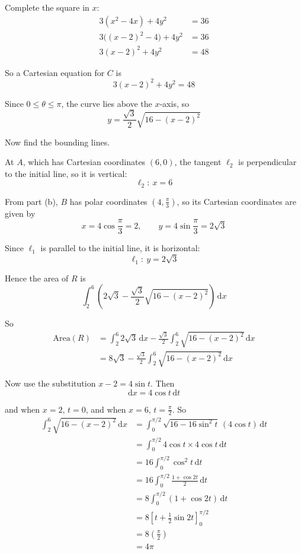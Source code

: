 \documentclass[leqno]{article}
\begin{document}
\begin{enumerate}[
  label=\textbf{\arabic*.},
  leftmargin=*,
  topsep=0pt,
  partopsep=0pt,
  parsep=0pt
]
\begin{djsSolution}
\begin{enumerate}[label=\textbf{(\alph*)}]
Complete the square in \(x\):
\begin{align*}
3(x^2-4x)+4y^2&=36 \\
3\bigl((x-2)^2-4\bigr)+4y^2&=36 \\
3(x-2)^2+4y^2&=48
\end{align*}

So a Cartesian equation for \(C\) is
\[
3(x-2)^2+4y^2=48
\]

Since \(0\leq \theta\leq \pi\), the curve lies above the \(x\)-axis, so
\[
y=\frac{\sqrt{3}}{2}\sqrt{16-(x-2)^2}
\]

Now find the bounding lines.

At \(A\), which has Cartesian coordinates \((6,0)\), the tangent \(\ell_2\) is perpendicular to the initial line, so it is vertical:
\[
\ell_2:\ x=6
\]

From part (b), \(B\) has polar coordinates \(\left(4,\frac{\pi}{3}\right)\), so its Cartesian coordinates are given by
\[
x=4\cos\frac{\pi}{3}=2,
\qquad
y=4\sin\frac{\pi}{3}=2\sqrt{3}
\]

Since \(\ell_1\) is parallel to the initial line, it is horizontal:
\[
\ell_1:\ y=2\sqrt{3}
\]

Hence the area of \(R\) is
\[
\int_{2}^{6}\left(2\sqrt{3}-\frac{\sqrt{3}}{2}\sqrt{16-(x-2)^2}\right)\,\mathrm{d}x
\]

So
\begin{align*}
\text{Area}(R)
&=
\int_{2}^{6}2\sqrt{3}\,\mathrm{d}x
-
\frac{\sqrt{3}}{2}\int_{2}^{6}\sqrt{16-(x-2)^2}\,\mathrm{d}x \\
&=
8\sqrt{3}
-
\frac{\sqrt{3}}{2}\int_{2}^{6}\sqrt{16-(x-2)^2}\,\mathrm{d}x
\end{align*}

Now use the substitution \(x-2=4\sin t\). Then
\[
\mathrm{d}x=4\cos t\,\mathrm{d}t
\]

and when \(x=2\), \(t=0\), and when \(x=6\), \(t=\frac{\pi}{2}\). So
\begin{align*}
\int_{2}^{6}\sqrt{16-(x-2)^2}\,\mathrm{d}x
&=
\int_{0}^{\pi/2}\sqrt{16-16\sin^2 t}\,(4\cos t)\,\mathrm{d}t \\
&=
\int_{0}^{\pi/2}4\cos t\times 4\cos t\,\mathrm{d}t \\
&=
16\int_{0}^{\pi/2}\cos^2 t\,\mathrm{d}t \\
&=
16\int_{0}^{\pi/2}\frac{1+\cos 2t}{2}\,\mathrm{d}t \\
&=
8\int_{0}^{\pi/2}(1+\cos 2t)\,\mathrm{d}t \\
&=
8\left[t+\frac12\sin 2t\right]_{0}^{\pi/2} \\
&=
8\left(\frac{\pi}{2}\right) \\
&=
4\pi
\end{align*}


\end{enumerate}
\end{djsSolution}
\end{enumerate}
\end{document}
